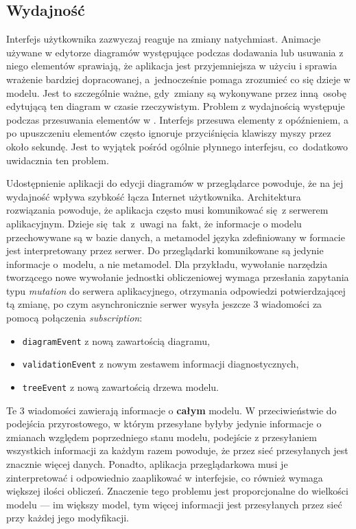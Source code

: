 \subsection{Wydajność}

Interfejs użytkownika \SiriusWeb{} zazwyczaj reaguje na zmiany natychmiast.
Animacje używane w edytorze diagramów występujące podczas dodawania lub
usuwania z niego elementów sprawiają, że aplikacja jest przyjemniejsza w użyciu
i sprawia wrażenie bardziej dopracowanej, a~jednocześnie pomaga zrozumieć co
się dzieje w modelu. Jest to szczególnie ważne, gdy~zmiany są wykonywane przez
inną osobę edytującą ten diagram w czasie rzeczywistym.
Problem z wydajnością występuje podczas przesuwania elementów w \SiriusWeb{}.
Interfejs przesuwa elementy z opóźnieniem, a po upuszczeniu
elementów
często ignoruje przyciśnięcia klawiszy myszy przez około sekundę. Jest to
wyjątek pośród ogólnie płynnego interfejsu, co~dodatkowo uwidacznia ten
problem.

Udostępnienie aplikacji do edycji diagramów w przeglądarce powoduje, że na
jej wydajność wpływa szybkość łącza Internet użytkownika. Architektura
rozwiązania \SiriusWeb{} powoduje, że aplikacja często musi komunikować
się z serwerem aplikacyjnym. Dzieje się~tak~z~uwagi na~fakt, że informacje o
modelu przechowywane są w bazie danych, a metamodel języka zdefiniowany w
formacie \Ecore{} jest
interpretowany przez serwer. Do przeglądarki komunikowane są jedynie informacje
o~modelu, a nie metamodel. Dla przykładu, wywołanie narzędzia tworzącego nowe
wywołanie jednostki obliczeniowej wymaga przesłania zapytania typu
\emph{mutation} do serwera aplikacyjnego, otrzymania odpowiedzi potwierdzającej
tą zmianę, po czym asynchronicznie serwer wysyła jeszcze 3 wiadomości
za pomocą połączenia \GraphQL{} \emph{subscription}:

\begin{itemize}
	\item \texttt{diagramEvent} z nową zawartością diagramu,
	\item \texttt{validationEvent} z nowym zestawem informacji
	      diagnostycznych,
	\item \texttt{treeEvent} z nową zawartością drzewa modelu.
\end{itemize}

Te 3 wiadomości zawierają informacje o \textbf{całym} modelu. W przeciwieństwie
do podejścia przyrostowego, w którym przesyłane byłyby jedynie informacje o
zmianach względem poprzedniego stanu modelu, podejście z przesyłaniem
wszystkich informacji za każdym razem powoduje, że przez sieć przesyłanych jest
znacznie więcej danych. Ponadto, aplikacja przeglądarkowa musi je
zinterpretować i odpowiednio zaaplikować w interfejsie, co również wymaga
większej ilości obliczeń. Znaczenie tego problemu jest proporcjonalne do
wielkości modelu --- im większy model, tym więcej informacji jest przesyłanych
przez sieć przy każdej jego modyfikacji.

